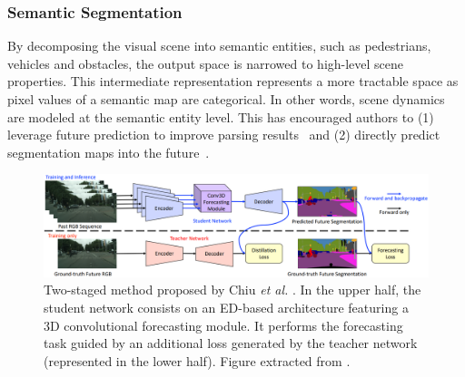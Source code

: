 \subsubsection{Semantic Segmentation}
By decomposing the visual scene into semantic entities, such as pedestrians, vehicles and obstacles, the output space is narrowed to high-level scene properties. This intermediate representation represents a more tractable space as pixel values of a semantic map are categorical. In other words, scene dynamics are modeled at the semantic entity level. This has encouraged authors to (1) leverage future prediction to improve parsing results~\cite{Jin2017} and (2) directly predict segmentation maps into the future~\cite{Luc2017, Luc2018, Luc2019}.
\begin{figure}[tbp]
	\centering
	\includegraphics[width=\textwidth]{Figures/videoprediction/methods/student_teacher.png}
	\caption{Two-staged method proposed by Chiu \textit{et al.} \cite{Chiu2019}. In the upper half, the student network consists on an \ac{ED}-based architecture featuring a 3D convolutional forecasting module. It performs the forecasting task guided by an additional loss generated by the teacher network (represented in the lower half). Figure extracted from \cite{Chiu2019}.}
	\label{fig:student_teacher}
\end{figure}

